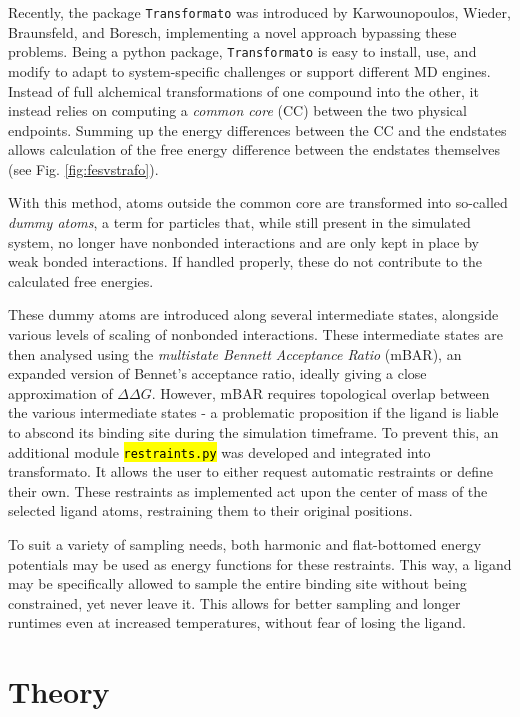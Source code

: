 \documentclass[oneside]{scrreprt}
\newcommand{\code}[1]{\texttt{\hl{#1}}}
\begin{document}
Recently, the package \texttt{Transformato} was introduced by Karwounopoulos, Wieder, Braunsfeld, and Boresch\supercite{Karwou2022Jun,braunsfeldImplementationTestingCHARMM,Wieder2022Jun}, implementing a novel approach bypassing these problems. Being a python package, \texttt{Transformato} is easy to install, use, and modify to adapt to system-specific challenges or support different MD engines. Instead of full alchemical transformations of one compound into the other, it instead relies on computing a \emph{common core} (CC) between the two physical endpoints. Summing up the energy differences between the CC and the endstates allows calculation of the free energy difference between the endstates themselves (see Fig. \ref{fig:fesvstrafo}).



With this method, atoms outside the common core are transformed into so-called \emph{dummy atoms}, a term for particles that, while still present in the simulated system, no longer have nonbonded interactions and are only kept in place by weak bonded interactions. If handled properly, these do not contribute to the calculated free energies\supercite{fleckDummyAtomsAlchemical2021}.

These dummy atoms are introduced along several intermediate states, alongside various levels of scaling of nonbonded interactions. These intermediate states are then analysed using the \emph{multistate Bennett Acceptance Ratio}\supercite{Shirts2008Sep} (mBAR), an expanded version of Bennet's acceptance ratio\supercite{Bennett1976Oct}, ideally giving a close approximation of $\Delta\Delta G$. However, mBAR requires topological overlap between the various intermediate states - a problematic proposition if the ligand is liable to abscond its binding site during the simulation timeframe. To prevent this, an additional module \code{restraints.py} was developed and integrated into transformato. It allows the user to either request automatic restraints or define their own. These restraints as implemented act upon the center of mass of the selected ligand atoms, restraining them to their original positions.

To suit a variety of sampling needs, both harmonic and flat-bottomed energy potentials may be used as energy functions for these restraints. This way, a ligand may be specifically allowed to sample the entire binding site without being constrained, yet never leave it. This allows for better sampling and longer runtimes even at increased temperatures, without fear of losing the ligand.
\chapter{Theory}
\end{document}
